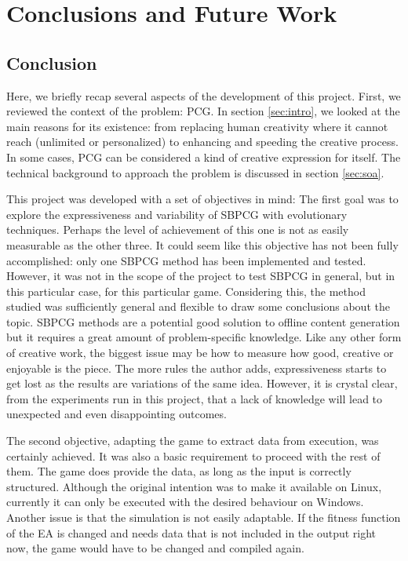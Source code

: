 \documentclass[runningheads,a4paper]{llncs}
\begin{document}



%
\section{Conclusions and Future Work} 
\label{sec:conclusions}
\subsection{Conclusion}

Here, we briefly recap several aspects of the development of this project. 
First, we reviewed the context of the problem: PCG. In section \ref{sec:intro}, 
we looked at the main reasons for its existence: from replacing human 
creativity where it cannot reach (unlimited or personalized) to enhancing and 
speeding the creative process. In some cases, PCG can  be considered a kind of 
creative expression for itself. The technical background to approach the 
problem is discussed in section \ref{sec:soa}.


This project was developed with a set of objectives in mind: The first goal was to explore the expressiveness and variability of SBPCG with evolutionary techniques. Perhaps the level of achievement of this one is not as easily measurable as the other three. It could seem like this objective has not been fully accomplished: only one SBPCG method has been implemented and tested. However, it was not in the scope of the project to test SBPCG in general, but in this particular case, for this particular game. Considering this, the method studied was sufficiently general and flexible to draw some conclusions about the topic. SBPCG methods are a potential good solution to offline content generation but it requires a great amount of problem-specific knowledge. Like any other form of creative work, the biggest issue may be how to measure how good, creative or enjoyable is the piece. The more rules the author adds, expressiveness starts to get lost as the results are variations of the same idea. However, it is crystal clear, from the experiments run in this project, that a lack of knowledge will lead to unexpected and even disappointing outcomes.

The second objective, adapting the game to extract data from execution, was 
certainly achieved. It was also a basic requirement to proceed with the rest of 
them. The game does provide the data, as long as the input is correctly 
structured. Although the original intention was to make it available on Linux, 
currently it can only be executed with the desired behaviour on Windows. 
Another issue is that the simulation is not easily adaptable. If the fitness 
function of the EA is changed and needs data that is not included in the output 
right now, the game would have to be changed and compiled again.
\end{document}
